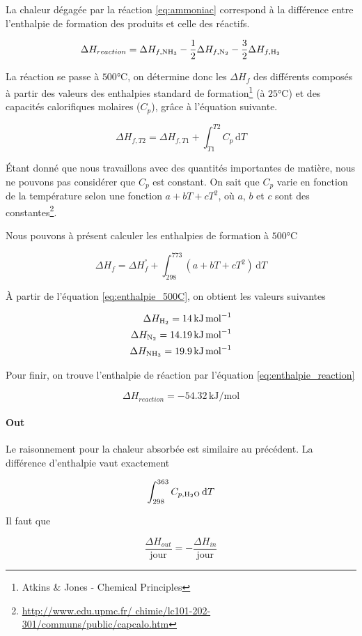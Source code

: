\documentclass[a4paper, oneside, 12pt]{article}
\begin{document}
La chaleur dégagée par la réaction \ref{eq:ammoniac} correspond à la 
différence entre l'enthalpie de formation des produits et celle des réactifs. 

\begin{equation}
	\Delta H_{reaction} = \Delta H_{f, \ce{NH3}} 
	- \frac{1}{2} \Delta H_{f, \ce{N2}}
	- \frac{3}{2} \Delta H_{f, \ce{H2}}
	\label{eq:enthalpie_reaction}
\end{equation}

La réaction se passe à $500 \si{\degreeCelsius}$, 
on détermine donc les $\Delta H_{f}$ des différents 
composés à partir des valeurs des enthalpies standard
de formation\footnote{Atkins \& Jones - Chemical Principles}
(à $25 \si{\degreeCelsius}$)
et des capacités calorifiques molaires ($C_p$), gr\^ace 
à l'équation suivante.

\begin{equation}
	\Delta H_{f, T2} = \Delta H_{f, T1} 
	+ \int_{T1}^{T2} C_p \, \mathrm{d}T
	\label{eq:enthalpie_temp}
\end{equation}

Étant donné que nous travaillons avec des quantités importantes de matière,
nous ne pouvons pas considérer que $C_p$ est constant.
On sait que $C_p$ varie en fonction de la température 
selon une fonction $a + b T + c T^2$, 
où $a$, $b$ et $c$ sont des constantes\footnote{\url{http://www.edu.upmc.fr/
chimie/lc101-202-301/communs/public/capcalo.htm}}. 

Nous pouvons à présent calculer les enthalpies 
de formation à $500 \si{\degreeCelsius}$

\begin{equation}
	\Delta H_f = \Delta H_{f}^{\si{\degree}} + 
	\int_{298}^{773} (a + b T + c T^2) \, \mathrm{d}T
	\label{eq:enthalpie_500C}
\end{equation}

À partir de l'équation \ref{eq:enthalpie_500C}, 
on obtient les valeurs suivantes

\begin{align*}
	\Delta H_{\ce{H2}} = 14 \, \si{\kilo\joule\per\mole} \\
	\Delta H_{\ce{N2}} = 14.19 \, \si{\kilo\joule\per\mole} \\
	\Delta H_{\ce{NH3}} = 19.9 \, \si{\kilo\joule\per\mole} \\
\end{align*}

Pour finir, on trouve l'enthalpie de réaction par l'équation \ref{eq:enthalpie_reaction}

\[
	\Delta H_{reaction} = -54.32 \, \si{\kilo\joule\per\mole}
\]

\paragraph{Out}

Le raisonnement pour la chaleur absorbée est similaire 
au précédent.
La différence d'enthalpie vaut exactement

\[
	\int_{298}^{363} C_{p, \ce{H2O}} \, \mathrm{d}T
\]

Il faut que

\[
	\frac{\Delta H_{out}}{\mathrm{jour}} 
	= - \frac{\Delta H_{in}}{\mathrm{jour}}
\]
\end{document}
